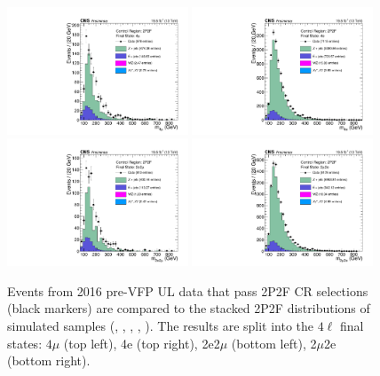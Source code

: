 \begin{figure}[!htbp]
	\begin{center}
		\includegraphics[width=0.48\textwidth]{figures/higgsmassmeas/redbkg/cr/UL2016preVFP_CR_2P2F_4mu.pdf}
		\includegraphics[width=0.48\textwidth]{figures/higgsmassmeas/redbkg/cr/UL2016preVFP_CR_2P2F_4e.pdf}
		\includegraphics[width=0.48\textwidth]{figures/higgsmassmeas/redbkg/cr/UL2016preVFP_CR_2P2F_2e2mu.pdf}
		\includegraphics[width=0.48\textwidth]{figures/higgsmassmeas/redbkg/cr/UL2016preVFP_CR_2P2F_2mu2e.pdf}
		\caption{
			Events from 2016 pre-VFP UL data that pass 2P2F CR selections (black markers) 
			are compared to the stacked 2P2F distributions of simulated samples
			(\Zplusjets, \ttbarplusjets, \WZ, \ZZ, \Zgammastar).
			The results are split into the $4\ell$ final states:
            $4\mu$ (top left), 4e (top right), 2e2$\mu$ (bottom left), 2$\mu$2e (bottom right).
        }
		\label{cr_plots_2p2f_2016prevfp}
	\end{center}
\end{figure}
